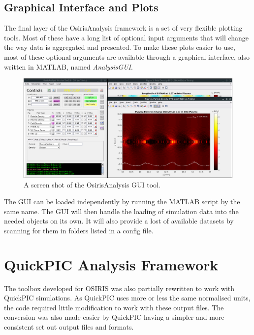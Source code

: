 \subsection{Graphical Interface and Plots}
\label{Tools:OALay3}

The final layer of the OsirisAnalysis framework is a set of very flexible plotting tools.
Most of these have a long list of optional input arguments that will change the way data is aggregated and presented.
To make these plots easier to use, most of these optional arguments are available through a graphical interface, also written in MATLAB, named \emph{AnalysisGUI}.

\begin{figure}[hbt]
    \centering
    \includegraphics[width=0.99\linewidth,trim={0mm 0mm 0mm 0mm},clip]{images/OsirisAnalysisGUI}
    \caption{\label{Fig:OAGUI} A screen shot of the OsirisAnalysis GUI tool.}
\end{figure}

The GUI can be loaded independently by running the MATLAB script by the same name.
The GUI will then handle the loading of simulation data into the needed objects on its own.
It will also provide a lost of available datasets by scanning for them in folders listed in a config file.

\section{QuickPIC Analysis Framework}
\label{Tools:QA}

The toolbox developed for OSIRIS was also partially rewritten to work with QuickPIC simulations.
As QuickPIC uses more or less the same normalised units, the code required little modification to work with these output files.
The conversion was also made easier by QuickPIC having a simpler and more consistent set out output files and formats.

